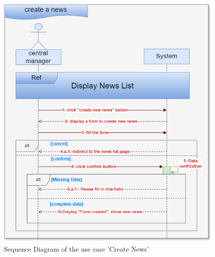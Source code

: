 \begin{figure}[h]
    \centering
    \includegraphics[width=1\textwidth]{figures/seq create a news.png}
    \caption{Sequence Diagram of the use case 'Create News'}
\end{figure}\
\clearpage

